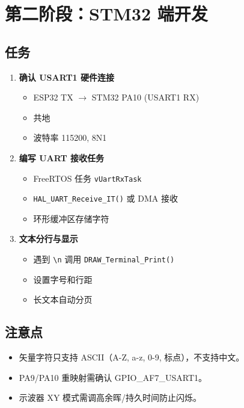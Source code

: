 \documentclass[12pt,a4paper,openany]{ctexbook}
\begin{document}
\section{第二阶段：STM32 端开发}

\subsection*{任务}
\begin{enumerate}[leftmargin=2em, label=\textbf{\arabic*.}]
    \item \textbf{确认 USART1 硬件连接}
    \begin{itemize}
        \item ESP32 TX $\to$ STM32 PA10 (USART1 RX)
        \item 共地
        \item 波特率 115200, 8N1
    \end{itemize}

    \item \textbf{编写 UART 接收任务}
    \begin{itemize}
        \item FreeRTOS 任务 \texttt{vUartRxTask}
        \item \texttt{HAL\_UART\_Receive\_IT()} 或 DMA 接收
        \item 环形缓冲区存储字符
    \end{itemize}

    \item \textbf{文本分行与显示}
    \begin{itemize}
        \item 遇到 \texttt{\textbackslash n} 调用 \texttt{DRAW\_Terminal\_Print()}
        \item 设置字号和行距
        \item 长文本自动分页
    \end{itemize}
\end{enumerate}

\subsection*{注意点}
\begin{itemize}
    \item 矢量字符只支持 ASCII（A-Z, a-z, 0-9, 标点），不支持中文。
    \item PA9/PA10 重映射需确认 GPIO\_AF7\_USART1。
    \item 示波器 XY 模式需调高余晖/持久时间防止闪烁。
\end{itemize}
\end{document}
